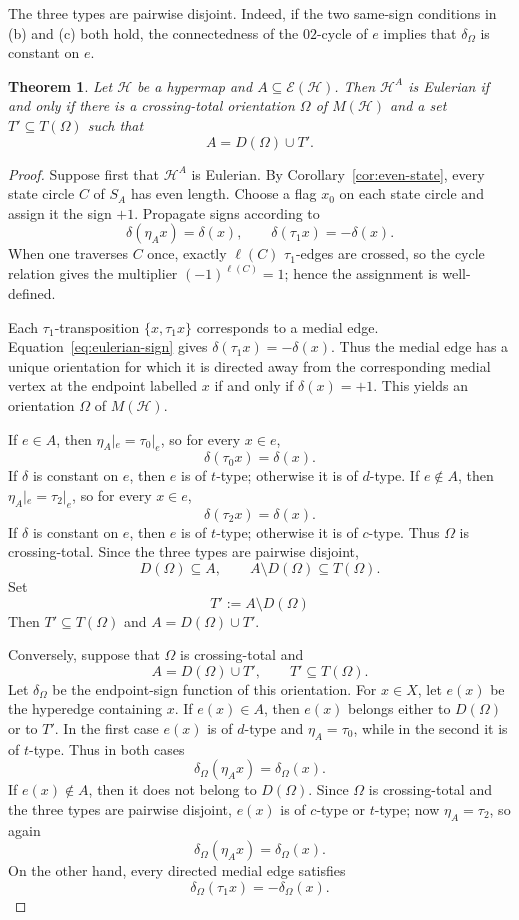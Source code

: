 \documentclass{article}
\newtheorem{theorem}{Theorem}[section]
\theoremstyle{definition}
\theoremstyle{remark}
\newcommand{\Hcal}{\mathcal{H}}
\newcommand{\Ecal}{\mathcal{E}}
\begin{document}
The three types are pairwise disjoint. Indeed, if the two same-sign conditions in (b) and (c) both hold, the connectedness of the $02$-cycle of $e$ implies that $\delta_\Omega$ is constant on $e$.

\begin{theorem}\label{thm:eulerian}
Let $\Hcal$ be a hypermap and $A\subseteq\Ecal(\Hcal)$. Then $\Hcal^A$ is Eulerian if and only if there is a crossing-total orientation $\Omega$ of $M(\Hcal)$ and a set $T'\subseteq T(\Omega)$ such that
\[
 A=D(\Omega)\cup T'.
\]
\end{theorem}

\begin{proof}
Suppose first that $\Hcal^A$ is Eulerian. By Corollary~\ref{cor:even-state}, every state circle $C$ of $S_A$ has even length. Choose a flag $x_0$ on each state circle and assign it the sign $+1$. Propagate signs according to
\[
  \delta(\eta_Ax)=\delta(x),\qquad
  \delta(\tau_1x)=-\delta(x).
  \tag{E}\label{eq:eulerian-sign}
\]
When one traverses $C$ once, exactly $\ell(C)$ $\tau_1$-edges are crossed, so the cycle relation gives the multiplier $(-1)^{\ell(C)}=1$; hence the assignment is well-defined.

Each $\tau_1$-transposition $\{x,\tau_1x\}$ corresponds to a medial edge. Equation~\eqref{eq:eulerian-sign} gives $\delta(\tau_1x)=-\delta(x)$. Thus the medial edge has a unique orientation for which it is directed away from the corresponding medial vertex at the endpoint labelled $x$ if and only if $\delta(x)=+1$. This yields an orientation $\Omega$ of $M(\Hcal)$.

If $e\in A$, then $\eta_A|_e=\tau_0|_e$, so for every $x\in e$,
\[
  \delta(\tau_0x)=\delta(x).
\]
If $\delta$ is constant on $e$, then $e$ is of $t$-type; otherwise it is of $d$-type. If $e\notin A$, then $\eta_A|_e=\tau_2|_e$, so for every $x\in e$,
\[
  \delta(\tau_2x)=\delta(x).
\]
If $\delta$ is constant on $e$, then $e$ is of $t$-type; otherwise it is of $c$-type. Thus $\Omega$ is crossing-total. Since the three types are pairwise disjoint,
\[
  D(\Omega)\subseteq A,\qquad
  A\setminus D(\Omega)\subseteq T(\Omega).
\]
Set
\[
  T':=A\setminus D(\Omega)
\]
Then $T'\subseteq T(\Omega)$ and $A=D(\Omega)\cup T'$.

Conversely, suppose that $\Omega$ is crossing-total and
\[
  A=D(\Omega)\cup T',\qquad T'\subseteq T(\Omega).
\]
Let $\delta_\Omega$ be the endpoint-sign function of this orientation. For $x\in X$, let $e(x)$ be the hyperedge containing $x$. If $e(x)\in A$, then $e(x)$ belongs either to $D(\Omega)$ or to $T'$. In the first case $e(x)$ is of $d$-type and $\eta_A=\tau_0$, while in the second it is of $t$-type. Thus in both cases
\[
  \delta_\Omega(\eta_Ax)=\delta_\Omega(x).
\]
If $e(x)\notin A$, then it does not belong to $D(\Omega)$. Since $\Omega$ is crossing-total and the three types are pairwise disjoint, $e(x)$ is of $c$-type or $t$-type; now $\eta_A=\tau_2$, so again
\[
  \delta_\Omega(\eta_Ax)=\delta_\Omega(x).
\]
On the other hand, every directed medial edge satisfies
\[
  \delta_\Omega(\tau_1x)=-\delta_\Omega(x).
\]


\end{proof}
\end{document}
